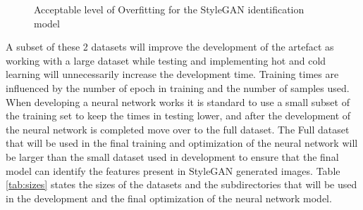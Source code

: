 \begin{figure}[H]%
\centering
{}%
\caption{Acceptable level of Overfitting for the StyleGAN identification model}%
\label{fig:11}%
\end{figure}
  
A subset of these 2 datasets will improve the development of the artefact as working with a large dataset while testing and implementing hot and cold learning will unnecessarily increase the development time. Training times are influenced by the number of epoch in training and the number of samples used. When developing a neural network works it is standard to use a small subset of the training set to keep the times in testing lower, and after the development of the neural network is completed move over to the full dataset. The Full dataset that will be used in the final training and optimization of the neural network will be larger than the small dataset used in development to ensure that the final model can identify the features present in StyleGAN generated images. Table \ref{tab:sizes} states the sizes of the datasets and the subdirectories that will be used in the development and the final optimization of the neural network model. 

\begin{table}[H]
\caption{Total amount of images used in the Artefact creation}
\label{tab:sizes}
\end{table}

